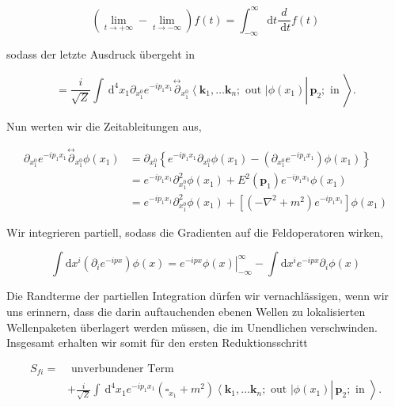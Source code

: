 \documentclass[10pt, letterpaper]{article}
\begin{document}
$$
\left(\lim _{t \rightarrow+\infty}-\lim _{t \rightarrow-\infty}\right) f(t)=\int_{-\infty}^{\infty} \mathrm{d} t \frac{d}{\mathrm{~d} t} f(t)
$$

sodass der letzte Ausdruck übergeht in

$$
\left.\left.=\frac{i}{\sqrt{Z}} \int \mathrm{~d}^{4} x_{1} \partial_{x_{1}^{0}} e^{-i p_{1} x_{1}} \stackrel{\leftrightarrow}{\partial}_{x_{1}^{0}}\left\langle\mathbf{k}_{1}, \ldots \mathbf{k}_{n} ; \text { out }\right| \phi\left(x_{1}\right) \right\rvert\, \mathbf{p}_{2} ; \text { in }\right\rangle .
$$

Nun werten wir die Zeitableitungen aus,

$$
\begin{aligned}
\partial_{x_{1}^{0}} e^{-i p_{1} x_{1}} \stackrel{\leftrightarrow}{\partial}_{x_{1}^{0}} \phi\left(x_{1}\right) & =\partial_{x_{1}^{0}}\left\{e^{-i p_{1} x_{1}} \partial_{x_{1}^{0}} \phi\left(x_{1}\right)-\left(\partial_{x_{1}^{0}} e^{-i p_{1} x_{1}}\right) \phi\left(x_{1}\right)\right\} \\
& =e^{-i p_{1} x_{1}} \partial_{x_{1}^{0}}^{2} \phi\left(x_{1}\right)+E^{2}\left(\mathbf{p}_{1}\right) e^{-i p_{1} x_{1}} \phi\left(x_{1}\right) \\
& =e^{-i p_{1} x_{1}} \partial_{x_{1}^{0}}^{2} \phi\left(x_{1}\right)+\left[\left(-\nabla^{2}+m^{2}\right) e^{-i p_{1} x_{1}}\right] \phi\left(x_{1}\right)
\end{aligned}
$$

Wir integrieren partiell, sodass die Gradienten auf die Feldoperatoren wirken,

$$
\int \mathrm{d} x^{i}\left(\partial_{i} e^{-i p x}\right) \phi(x)=\left.e^{-i p x} \phi(x)\right|_{-\infty} ^{\infty}-\int \mathrm{d} x^{i} e^{-i p x} \partial_{i} \phi(x)
$$

Die Randterme der partiellen Integration dürfen wir vernachlässigen, wenn wir uns erinnern, dass die darin auftauchenden ebenen Wellen zu lokalisierten Wellenpaketen überlagert werden müssen, die im Unendlichen verschwinden. Insgesamt erhalten wir somit für den ersten Reduktionsschritt

$$
\begin{aligned}
S_{f i}= & \text { unverbundener Term } \\
& \left.\left.+\frac{i}{\sqrt{Z}} \int \mathrm{~d}^{4} x_{1} e^{-i p_{1} x_{1}}\left(\square_{x_{1}}+m^{2}\right)\left\langle\mathbf{k}_{1}, \ldots \mathbf{k}_{n} ; \text { out }\right| \phi\left(x_{1}\right) \right\rvert\, \mathbf{p}_{2} ; \text { in }\right\rangle .
\end{aligned}
$$
\end{document}
